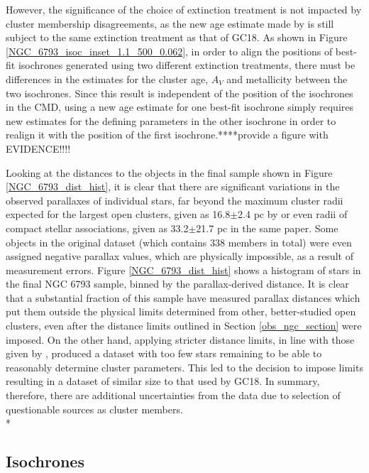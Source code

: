 \documentclass[12pt, a4paper]{report}
\begin{document}
However, the significance of the choice of extinction treatment is not impacted by cluster membership disagreements, as the new age estimate made by \cite{2019A&A...623A.108B} is still subject to the same extinction treatment as that of GC18. As shown in Figure 
\ref{NGC_6793_isoc_inset_1.1_500_0.062}, in order to align the positions of best-fit isochrones generated using two different extinction treatments, there must be differences in the estimates for the cluster age, $A_{V}$ and metallicity between the two isochrones. Since this result is independent of the position of the isochrones in the CMD, using a new age estimate for one best-fit isochrone simply requires new estimates for the defining parameters in the other isochrone in order to realign it with the position of the first isochrone.****provide a figure with EVIDENCE!!!!

Looking at the distances to the objects in the final sample shown in Figure \ref{NGC_6793_dist_hist}, it is clear that there are significant variations in the observed parallaxes of individual stars, far beyond the maximum cluster radii expected for the largest open clusters, given as 16.8$\pm$2.4 pc by \cite{2006A&A...456..523S} or even radii of compact stellar associations, given as 33.2$\pm$21.7 pc in the same paper. Some objects in the original dataset (which contains 338 members in total) were even assigned negative parallax values, which are physically impossible, as a result of measurement errors. Figure \ref{NGC_6793_dist_hist} shows a histogram of stars in the final NGC 6793 sample, binned by the parallax-derived distance. It is clear that a substantial fraction of this sample have measured parallax distances which put them outside the physical limits determined from other, better-studied open clusters, even after the distance limits outlined in Section \ref{obs_ngc_section} were imposed. On the other hand, applying stricter distance limits, in line with those given by \cite{2006A&A...456..523S}, produced a dataset with too few stars remaining to be able to reasonably determine cluster parameters. This led to the decision to impose limits resulting in a dataset of similar size to that used by GC18. In summary, therefore, there are additional uncertainties from the data due to selection of questionable sources as cluster members. \\*

\subsection{Isochrones}
\end{document}
